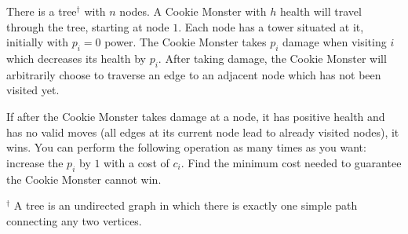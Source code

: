 There is a tree$^\dagger$ with $n$ nodes. A Cookie Monster with $h$ health will travel through the tree, starting at node $1$. Each node has a tower situated at it, initially with $p_i=0$ power. The Cookie Monster takes $p_i$ damage when visiting $i$ which decreases its health by $p_i$. After taking damage, the Cookie Monster will arbitrarily choose to traverse an edge to an adjacent node which has not been visited yet. 

If after the Cookie Monster takes damage at a node, it has positive health and has no valid moves (all edges at its current node lead to already visited nodes), it wins. You can perform the following operation as many times as you want: increase the $p_i$ by $1$ with a cost of $c_i$. Find the minimum cost needed to guarantee the Cookie Monster cannot win.

$^\dagger$ A tree is an undirected graph in which there is exactly one simple path connecting any two vertices.
